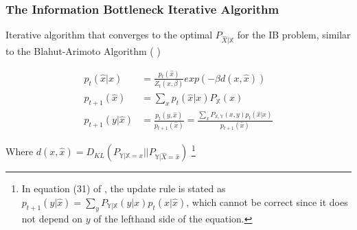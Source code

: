 \begin{frame}
    \frametitle{The Information Bottleneck Iterative Algorithm}
    Iterative algorithm that converges to the optimal $P_{\hat{X}|\mathbb{X}}$ for the IB problem, similar to the Blahut-Arimoto Algorithm (\cite{blahut_computation_1972} \cite{arimoto_algorithm_1972})

    \begin{align*}
        p_t(\hat{x}|x) &= \frac{p_t(\hat{x})}{Z_t(x, \beta)} exp(- \beta d(x, \hat{x}) ) \\
        p_{t+1}(\hat{x}) &= \sum_{x} p_t(\hat{x}|x) P_{\mathbb{X}}(x) \\
        p_{t+1}(y|\hat{x}) &= \frac{p_t(y, \hat{x})}{p_{t+1}(\hat{x})} = \frac{\sum_{x} P_{\mathbb{X},\mathbb{Y}}(x, y) p_t(\hat{x}|x)}{p_{t+1}(\hat{x})} 
    \end{align*} 

    Where $d(x, \hat{x}) = D_{KL}(P_{\mathbb{Y}|\mathbb{X}=x}|| P_{\mathbb{Y}|\hat{X}=\hat{x}})$ \footnote{
        In equation (31) of \cite{tishby_information_2000}, the update rule is stated as $p_{t+1}(y|\hat{x}) = \sum_y P_{\mathbb{Y}|\mathbb{X}}(y|x) p_t(x|\hat{x})$, which cannot be correct since it does not depend on $y$ of the lefthand side of the equation.
    }
    
\end{frame}
